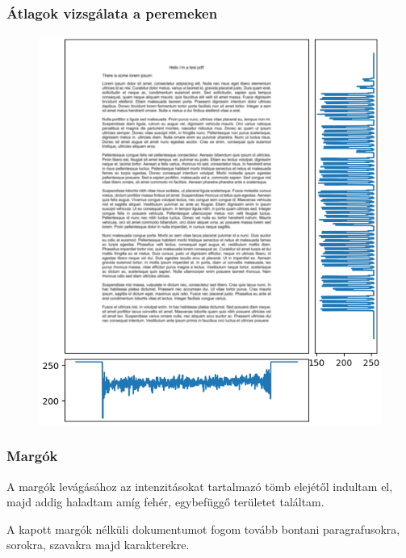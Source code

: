 \documentclass{beamer}
\begin{document}
\begin{frame}[fragile]
\frametitle{Átlagok vizsgálata a peremeken}

\begin{figure}[!tbp]
  \centering
  \begin{minipage}[b]{0.6\textwidth}
    \includegraphics[width=\textwidth]{images/intensity.png}
  \end{minipage}
\end{figure}

\end{frame}

\begin{frame}[fragile]
\frametitle{Margók}

A margók levágásához az intenzitásokat tartalmazó tömb elejétől indultam el, majd addig haladtam amíg fehér, egybefüggő területet találtam.

\bigskip

A kapott margók nélküli dokumentumot fogom tovább bontani paragrafusokra, sorokra, szavakra majd karakterekre.

\end{frame}
\end{document}

